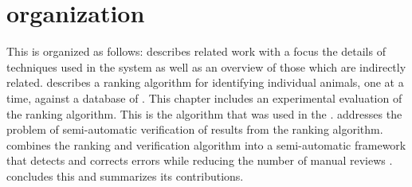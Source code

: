 \section{\Thesis{} organization} %
    This \thesis{} is organized as follows:
     describes related work with a focus the details of
      techniques used in the system as well as an overview of those which are
      indirectly related.
     describes a ranking algorithm for identifying
      individual animals, one \annot{} at a time, against a database of
      \exemplars{}.
    This chapter includes an experimental evaluation of the ranking algorithm.
    This is the algorithm that was used in the \GZC{}.
     addresses the problem of semi-automatic verification
      of results from the ranking algorithm.
     combines the ranking and verification algorithm into a
      semi-automatic framework that detects and corrects errors while reducing
      the number of manual reviews .
     concludes this \thesis{} and summarizes its contributions.
